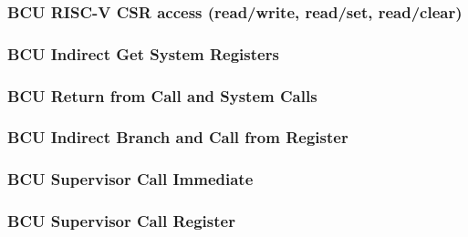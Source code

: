 \subsubsection[{\small BCU RISC-V CSR access (read/write, read/set, read/clear)}]{BCU RISC-V CSR access (read/write, read/set, read/clear)} \label{sec:format-BCU-CSR}



\subsubsection[{\small BCU Indirect Get System Registers}]{BCU Indirect Get System Registers} \label{sec:format-BCU-IGSR}



\subsubsection[{\small BCU Return from Call and System Calls}]{BCU Return from Call and System Calls} \label{sec:format-BCU-RTS}



\subsubsection[{\small BCU Indirect Branch and Call from Register}]{BCU Indirect Branch and Call from Register} \label{sec:format-BCU-IBC}



\subsubsection[{\small BCU Supervisor Call Immediate}]{BCU Supervisor Call Immediate} \label{sec:format-BCU-SCI}



\subsubsection[{\small BCU Supervisor Call Register}]{BCU Supervisor Call Register} \label{sec:format-BCU-SCR}

